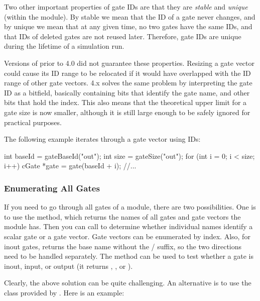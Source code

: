 Two other important properties of gate IDs are that they are \textit{stable}
and \textit{unique} (within the module). By stable we mean that the ID
of a gate never changes, and by unique we mean that at any
given time, no two gates have the same IDs, and that IDs of deleted
gates are not reused later. Therefore, gate IDs are unique during the lifetime
of a simulation run.

\begin{note}
    Versions of {\opp} prior to 4.0 did not guarantee these properties. Resizing
    a gate vector could cause its ID range to be relocated if it
    would have overlapped with the ID range of other gate vectors.
    {\opp} 4.x solves the same problem by interpreting the gate ID
    as a bitfield, basically containing bits that identify the gate name,
    and other bits that hold the index. This also means that the theoretical
    upper limit for a gate size is now smaller, although it is still
    large enough to be safely ignored for practical purposes.
\end{note}

The following example iterates through a gate vector using IDs:

\begin{cpp}
int baseId = gateBaseId("out");
int size = gateSize("out");
for (int i = 0; i < size; i++) {
    cGate *gate = gate(baseId + i);
    //...
}
\end{cpp}


\subsubsection{Enumerating All Gates}
\label{sec:simple-modules:enumerating-gates}

If you need to go through all gates of a module, there are
two possibilities. One is to use the  method,
which returns the names of all gates and gate vectors the module
has. Then you can call  to determine
whether individual names identify a scalar gate or a gate vector.
Gate vectors can be enumerated by index. Also, for inout
gates,  returns the base name without the
/ suffix, so the two directions
need to be handled separately. The  method
can be used to test whether a gate is inout, input, or output
(it returns , , or
).

Clearly, the above solution can be quite challenging. An alternative is to use
the  class provided by .
Here is an example:

